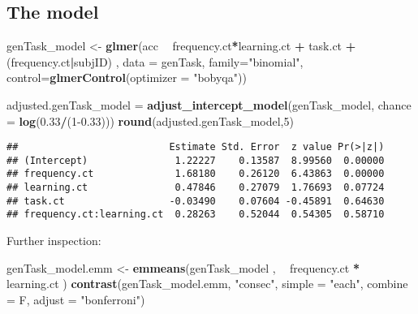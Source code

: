 \documentclass[
]{article}
\newenvironment{Shaded}{\begin{snugshade}}{\end{snugshade}}
\newcommand{\DataTypeTok}[1]{\textcolor[rgb]{0.13,0.29,0.53}{#1}}
\newcommand{\DecValTok}[1]{\textcolor[rgb]{0.00,0.00,0.81}{#1}}
\newcommand{\FloatTok}[1]{\textcolor[rgb]{0.00,0.00,0.81}{#1}}
\newcommand{\KeywordTok}[1]{\textcolor[rgb]{0.13,0.29,0.53}{\textbf{#1}}}
\newcommand{\NormalTok}[1]{#1}
\newcommand{\OperatorTok}[1]{\textcolor[rgb]{0.81,0.36,0.00}{\textbf{#1}}}
\newcommand{\StringTok}[1]{\textcolor[rgb]{0.31,0.60,0.02}{#1}}
\begin{document}
\hypertarget{the-model}{%
\subsection{The model}\label{the-model}}

\begin{Shaded}
\begin{Highlighting}[]
\NormalTok{genTask_model <-}\StringTok{ }\KeywordTok{glmer}\NormalTok{(acc }\OperatorTok{~}\StringTok{  }\NormalTok{frequency.ct}\OperatorTok{*}\NormalTok{learning.ct }\OperatorTok{+}\StringTok{ }\NormalTok{task.ct }\OperatorTok{+}\StringTok{ }\NormalTok{(frequency.ct}\OperatorTok{|}\NormalTok{subjID) , }
         \DataTypeTok{data =}\NormalTok{ genTask, }
         \DataTypeTok{family=}\StringTok{"binomial"}\NormalTok{,}
         \DataTypeTok{control=}\KeywordTok{glmerControl}\NormalTok{(}\DataTypeTok{optimizer =} \StringTok{"bobyqa"}\NormalTok{))}

\NormalTok{adjusted.genTask_model =}\StringTok{ }\KeywordTok{adjust_intercept_model}\NormalTok{(genTask_model, }\DataTypeTok{chance =} \KeywordTok{log}\NormalTok{(}\FloatTok{0.33}\OperatorTok{/}\NormalTok{(}\DecValTok{1}\FloatTok{-0.33}\NormalTok{)))}
\KeywordTok{round}\NormalTok{(adjusted.genTask_model,}\DecValTok{5}\NormalTok{)}
\end{Highlighting}
\end{Shaded}

\begin{verbatim}
##                          Estimate Std. Error  z value Pr(>|z|)
## (Intercept)               1.22227    0.13587  8.99560  0.00000
## frequency.ct              1.68180    0.26120  6.43863  0.00000
## learning.ct               0.47846    0.27079  1.76693  0.07724
## task.ct                  -0.03490    0.07604 -0.45891  0.64630
## frequency.ct:learning.ct  0.28263    0.52044  0.54305  0.58710
\end{verbatim}

Further inspection:

\begin{Shaded}
\begin{Highlighting}[]
\NormalTok{genTask_model.emm <-}\StringTok{ }\KeywordTok{emmeans}\NormalTok{(genTask_model , }\OperatorTok{~}\StringTok{ }\NormalTok{frequency.ct }\OperatorTok{*}\StringTok{ }\NormalTok{learning.ct )}
\KeywordTok{contrast}\NormalTok{(genTask_model.emm, }\StringTok{"consec"}\NormalTok{,  }\DataTypeTok{simple =} \StringTok{"each"}\NormalTok{, }\DataTypeTok{combine =}\NormalTok{ F, }\DataTypeTok{adjust =} \StringTok{"bonferroni"}\NormalTok{)}
\end{Highlighting}
\end{Shaded}
\end{document}
